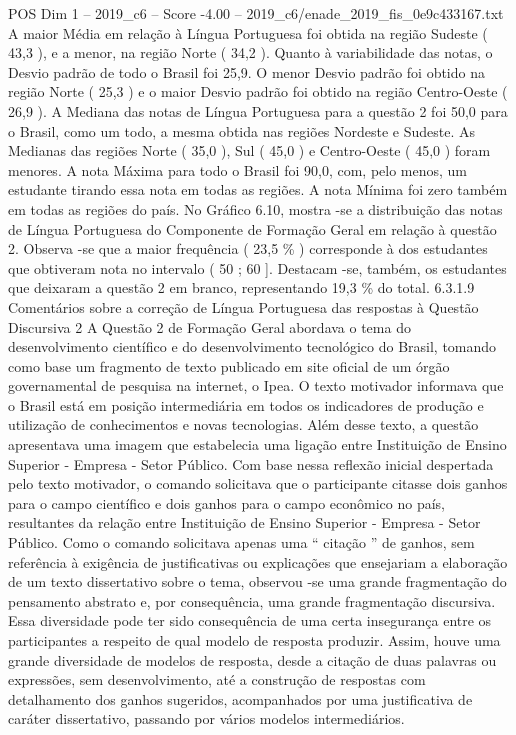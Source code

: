 \begin{textsample}{POS Dim 1 – 2019\_c6 – Score -4.00 – 2019\_c6/enade\_2019\_fis\_0e9c433167.txt}
A maior Média em relação à Língua Portuguesa foi obtida na região Sudeste ( 43,3 ), e a menor, na região Norte ( 34,2 ).
Quanto à variabilidade das notas, o Desvio padrão de todo o Brasil foi 25,9.
O menor Desvio padrão foi obtido na região Norte ( 25,3 ) e o maior Desvio padrão foi obtido na região Centro-Oeste ( 26,9 ).
A Mediana das notas de Língua Portuguesa para a questão 2 foi 50,0 para o Brasil, como um todo, a mesma obtida nas regiões Nordeste e Sudeste.
As Medianas das regiões Norte ( 35,0 ), Sul ( 45,0 ) e Centro-Oeste ( 45,0 ) foram menores.
A nota Máxima para todo o Brasil foi 90,0, com, pelo menos, um estudante tirando essa nota em todas as regiões.
A nota Mínima foi zero também em todas as regiões do país.
No Gráfico 6.10, mostra -se a distribuição das notas de Língua Portuguesa do Componente de Formação Geral em relação à questão 2.
Observa -se que a maior frequência ( 23,5 \% ) corresponde à dos estudantes que obtiveram nota no intervalo ( 50 ; 60 ].
Destacam -se, também, os estudantes que deixaram a questão 2 em branco, representando 19,3 \% do total. 6.3.1.9 Comentários sobre a correção de Língua Portuguesa das respostas à Questão Discursiva 2 A Questão 2 de Formação Geral abordava o tema do desenvolvimento científico e do desenvolvimento tecnológico do Brasil, tomando como base um fragmento de texto publicado em site oficial de um órgão governamental de pesquisa na internet, o Ipea.
O texto motivador informava que o Brasil está em posição intermediária em todos os indicadores de produção e utilização de conhecimentos e novas tecnologias.
Além desse texto, a questão apresentava uma imagem que estabelecia uma ligação entre Instituição de Ensino Superior - Empresa - Setor Público.
Com base nessa reflexão inicial despertada pelo texto motivador, o comando solicitava que o participante citasse dois ganhos para o campo científico e dois ganhos para o campo econômico no país, resultantes da relação entre Instituição de Ensino Superior - Empresa - Setor Público.
Como o comando solicitava apenas uma “ citação ” de ganhos, sem referência à exigência de justificativas ou explicações que ensejariam a elaboração de um texto dissertativo sobre o tema, observou -se uma grande fragmentação do pensamento abstrato e, por consequência, uma grande fragmentação discursiva.
Essa diversidade pode ter sido consequência de uma certa insegurança entre os participantes a respeito de qual modelo de resposta produzir.
Assim, houve uma grande diversidade de modelos de resposta, desde a citação de duas palavras ou expressões, sem desenvolvimento, até a construção de respostas com detalhamento dos ganhos sugeridos, acompanhados por uma justificativa de caráter dissertativo, passando por vários modelos intermediários.

\end{textsample}
